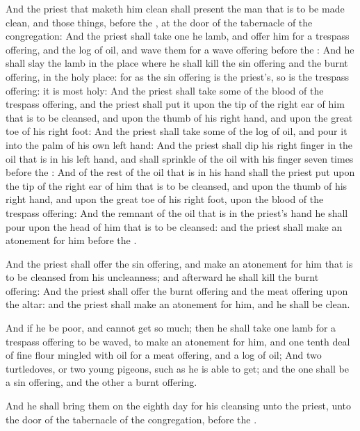 \Verse And the priest that maketh him clean shall present the man that is to be made clean, and those things, before the \LORD, at the door of the tabernacle of the congregation: \Verse And the priest shall take one he lamb, and offer him for a trespass offering, and the log of oil, and wave them for a wave offering before the \LORD: \Verse And he shall slay the lamb in the place where he shall kill the sin offering and the burnt offering, in the holy place: for as the sin offering is the priest's, so is the trespass offering: it is most holy: \Verse And the priest shall take some of the blood of the trespass offering, and the priest shall put it upon the tip of the right ear of him that is to be cleansed, and upon the thumb of his right hand, and upon the great toe of his right foot: \Verse And the priest shall take some of the log of oil, and pour it into the palm of his own left hand: \Verse And the priest shall dip his right finger in the oil that is in his left hand, and shall sprinkle of the oil with his finger seven times before the \LORD: \Verse And of the rest of the oil that is in his hand shall the priest put upon the tip of the right ear of him that is to be cleansed, and upon the thumb of his right hand, and upon the great toe of his right foot, upon the blood of the trespass offering: \Verse And the remnant of the oil that is in the priest's hand he shall pour upon the head of him that is to be cleansed: and the priest shall make an atonement for him before the \LORD.

\Verse And the priest shall offer the sin offering, and make an atonement for him that is to be cleansed from his uncleanness; and afterward he shall kill the burnt offering: \Verse And the priest shall offer the burnt offering and the meat offering upon the altar: and the priest shall make an atonement for him, and he shall be clean.

\Verse And if he be poor, and cannot get so much; then he shall take one lamb for a trespass offering to be waved, to make an atonement for him, and one tenth deal of fine flour mingled with oil for a meat offering, and a log of oil; \Verse And two turtledoves, or two young pigeons, such as he is able to get; and the one shall be a sin offering, and the other a burnt offering.

\Verse And he shall bring them on the eighth day for his cleansing unto the priest, unto the door of the tabernacle of the congregation, before the \LORD.

